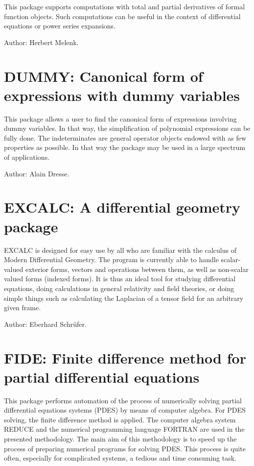 This package supports computations with total and partial derivatives of
formal function objects.  Such computations can be useful in the context
of differential equations or power series expansions.

Author: Herbert Melenk.


\newpage

\section{DUMMY: Canonical form of expressions with dummy variables}

This package allows a user to find the canonical form of expressions
involving dummy variables. In that way, the simplification of
polynomial expressions can be fully done. The indeterminates are general
operator objects endowed with as few properties as possible. In that way
the package may be used in a large spectrum of applications.

Author: Alain Dresse.


\newpage

\section{EXCALC: A differential geometry package} 

EXCALC is designed for easy use by all who are familiar with the calculus
of Modern Differential Geometry. The program is currently able to handle
scalar-valued exterior forms, vectors and operations between them, as well
as non-scalar valued forms (indexed forms). It is thus an ideal tool for
studying differential equations, doing calculations in general relativity
and field theories, or doing simple things such as calculating the
Laplacian of a tensor field for an arbitrary given frame.

Author: Eberhard Schr\"ufer.


\newpage

\section{FIDE: Finite difference method for partial differential equations}

This package performs  automation of  the process of numerically
solving  partial  differential  equations  systems  (PDES)  by  means of
computer algebra.  For PDES solving, the finite difference method is applied.
The  computer  algebra  system  REDUCE  and  the  numerical  programming
language FORTRAN  are used in the presented methodology. The main aim of
this methodology is to speed up the process of preparing numerical
programs for  solving PDES.  This process is quite often, especially for
complicated systems, a tedious and time consuming task.

